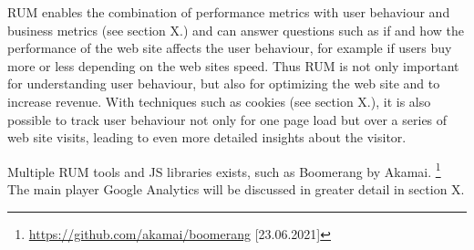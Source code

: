 RUM enables the combination of performance metrics with user behaviour and business metrics (see section X.) and can answer questions such as if and how the performance of the web site affects the user behaviour, for example if users buy more or less depending on the web sites speed.%
Thus RUM is not only important for understanding user behaviour, but also for optimizing the web site and to increase revenue.
With techniques such as cookies (see section X.), it is also possible to track user behaviour not only for one page load but over a series of web site visits, leading to even more detailed insights about the visitor. %



Multiple RUM tools and JS libraries exists, such as Boomerang by Akamai. \footnote{\url{https://github.com/akamai/boomerang} [23.06.2021]}
The main player Google Analytics will be discussed in greater detail in section X.











